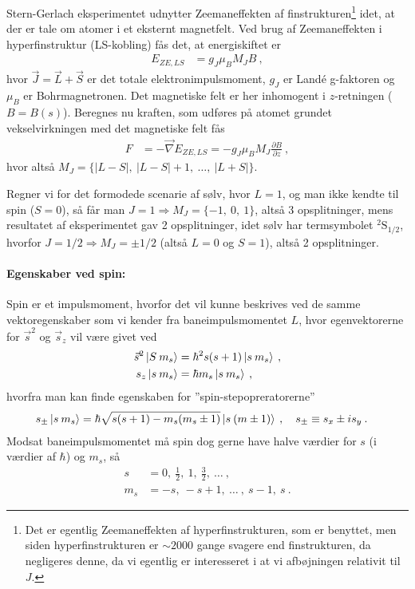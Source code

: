 Stern-Gerlach eksperimentet udnytter Zeemaneffekten af finstrukturen\footnote{Det er egentlig Zeemaneffekten af hyperfinstrukturen, som er benyttet, men siden hyperfinstrukturen er $\sim 2000$ gange svagere end finstrukturen, da negligeres denne, da vi egentlig er interesseret i at vi afbøjningen relativit til $J$.} idet, at der er tale om atomer i et eksternt magnetfelt. Ved brug af Zeemaneffekten i hyperfinstruktur (LS-kobling) fås det, at energiskiftet er
\begin{align}
    E_{ZE,LS} &= g_J \mu_B M_J B \: ,
\end{align}
hvor $\Vec{J} = \Vec{L} + \Vec{S}$ er det totale elektronimpulsmoment, $g_J$ er Landé g-faktoren og $\mu_B$ er Bohrmagnetronen. Det magnetiske felt er her inhomogent i $z$-retningen ($B = B(s)$). Beregnes nu kraften, som udføres på atomet grundet vekselvirkningen med det magnetiske felt fås
\begin{align} \label{eq:Q08_KraftenISternGerlach}
    F &= -\Vec{\nabla}E_{ZE,LS} = - g_J \mu_B M_J \frac{\partial B}{\partial z} \: ,
\end{align}
hvor altså $M_J = \{|L-S|,\: |L-S|+1,\: \ldots ,\: |L+S|\}$.

Regner vi for det formodede scenarie af sølv, hvor $L = 1$, og man ikke kendte til spin ($S=0$), så får man $J = 1 \Rightarrow M_J = \{-1,\: 0,\: 1\}$, altså 3 opsplitninger, mens resultatet af eksperimentet gav 2 opsplitninger, idet sølv har termsymbolet ${}^2\text{S}_{1/2}$, hvorfor $J = 1/2 \Rightarrow M_J = \pm 1/2$ (altså $L = 0$ og $S = 1$), altså 2 opsplitninger.


\paragraph{Egenskaber ved spin:} Spin er et impulsmoment, hvorfor det vil kunne beskrives ved de samme vektoregenskaber som vi kender fra baneimpulsmomentet $L$, hvor egenvektorerne for $\Vec{s}^2$ og $\Vec{s}_z$ vil være givet ved
\begin{align}
    \Vec{s}^2\ket{S \: m_s} &= \hbar^2 s(s+1) \ket{s \: m_s} \label{eq:Q08_EgenvektorligningForS^2} \: , \\
    s_z\ket{s \: m_s} &= \hbar m_s \ket{s \: m_s} \: , \label{eq:Q08_EgenvektorligningForS_z}
\end{align}
hvorfra man kan finde egenskaben for ''spin-stepopreratorerne''
\begin{align}
    s_\pm \ket{s \: m_s} &= \hbar \sqrt{s(s+1) - m_s(m_s \pm 1)} \ket{s \: (m \pm 1)} \: , \quad s_\pm \equiv s_x \pm i s_y \: .
\end{align}
\noindent
Modsat baneimpulsmomentet må spin dog gerne have halve værdier for $s$ (i værdier af $\hbar$) og $m_s$, så
\begin{align}
    s &= 0, \: \frac{1}{2}, \: 1, \: \frac{3}{2}, \: \ldots \: , \\
    m_s &= -s, \: -s + 1, \: \ldots \: , \: s - 1, \: s \: .
\end{align}

